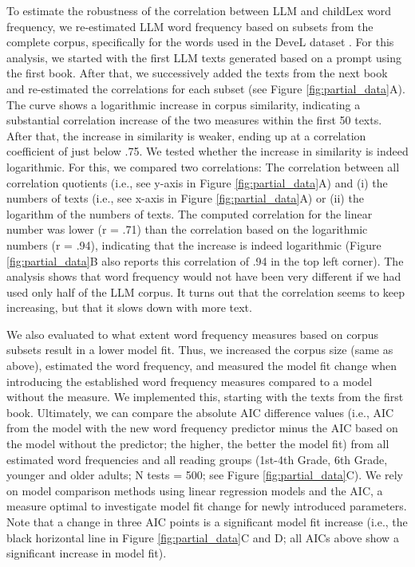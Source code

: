 \documentclass[doc, a4paper, anonymous]{apa7}
\begin{document}
To estimate the robustness of the correlation between LLM and childLex word frequency, we re-estimated LLM word frequency based on subsets from the complete corpus, specifically for the words used in the DeveL dataset \citep{schroter_developmental_2017}. For this analysis, we started with the first LLM texts generated based on a prompt using the first book. After that, we successively added the texts from the next book and re-estimated the correlations for each subset (see Figure \ref{fig:partial_data}A). The curve shows a logarithmic increase in corpus similarity, indicating a substantial correlation increase of the two measures within the first 50 texts. After that, the increase in similarity is weaker, ending up at a correlation coefficient of just below .75. We tested whether the increase in similarity is indeed logarithmic. For this, we compared two correlations: The correlation between all correlation quotients (i.e., see y-axis in Figure \ref{fig:partial_data}A) and (i) the numbers of texts (i.e., see x-axis in Figure \ref{fig:partial_data}A) or (ii) the logarithm of the numbers of texts. The computed correlation for the linear number was lower (r = .71) than the correlation based on the logarithmic numbers (r = .94), indicating that the increase is indeed logarithmic  (Figure \ref{fig:partial_data}B also reports this correlation of .94 in the top left corner). The analysis shows that word frequency would not have been very different if we had used only half of the LLM corpus. It turns out that the correlation seems to keep increasing, but that it slows down with more text. 

We also evaluated to what extent word frequency measures based on corpus subsets result in a lower model fit. Thus, we increased the corpus size (same as above), estimated the word frequency, and measured the model fit change when introducing the established word frequency measures compared to a model without the measure. We implemented this, starting with the texts from the first book. Ultimately, we can compare the absolute AIC difference values (i.e., AIC from the model with the new word frequency predictor minus the AIC based on the model without the predictor; the higher, the better the model fit) from all estimated word frequencies and all reading groups (1st-4th Grade, 6th Grade, younger and older adults; N tests = 500; see Figure \ref{fig:partial_data}C). We rely on model comparison methods using linear regression models and the AIC, a measure optimal to investigate model fit change for newly introduced parameters. Note that a change in three AIC points is a significant model fit increase (i.e., the black horizontal line in Figure \ref{fig:partial_data}C and D; all AICs above show a significant increase in model fit).
\end{document}
